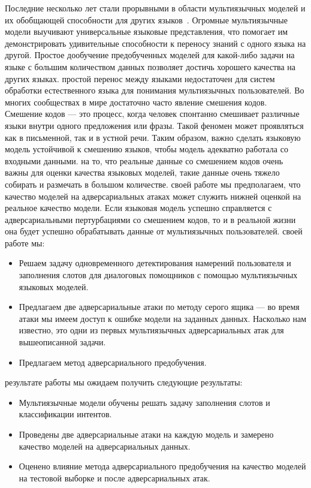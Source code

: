 Последние несколько лет стали прорывными в области мультиязычных моделей и их обобщающей способности для других языков~\cite{Conneau2020UnsupervisedCR,devlin-etal-2019-bert,Liu2020WhatMM,Wu2019BetoBB}.
Огромные мультиязычные модели выучивают универсальные языковые представления, что помогает им демонстрировать удивительные способности к переносу знаний с одного языка на другой.
Простое дообучение предобученных моделей для какой-либо задачи на языке с большим количеством данных позволяет достичь хорошего качества на других языках.
 простой перенос между языками недостаточен для систем обработки естественного языка для понимания мультиязычных пользователей.
Во многих сообществах в мире достаточно часто явление смешения кодов.
Смешение кодов — это процесс, когда человек спонтанно смешивает различные языки внутри одного предложения или фразы.
Такой феномен может проявляться как в письменной, так и в устной речи.
Таким образом, важно сделать языковую модель устойчивой к смешению языков, чтобы модель адекватно работала со входными данными.
 на то, что реальные данные со смешением кодов очень важны для оценки качества языковых моделей, такие данные очень тяжело собирать и размечать в большом количестве.
 своей работе мы предполагаем, что качество моделей на адверсариальных атаках может служить нижней оценкой на реальное качество модели.
Если языковая модель успешно справляется с адверсариальными пертурбациями со смешением кодов, то и в реальной жизни она будет успешно обрабатывать данные от мультиязычных пользователей.
 своей работе мы:
\begin{itemize}
    \item Решаем задачу одновременного детектирования намерений пользователя и заполнения слотов для диалоговых помощников с помощью мультиязычных языковых моделей.
    \item Предлагаем две адверсариальные атаки по методу серого ящика — во время атаки мы имеем доступ к ошибке модели на заданных данных.
    Насколько нам известно, это одни из первых мультиязычных адверсариальных атак для вышеописанной задачи.
    \item Предлагаем метод адверсариального предобучения.
\end{itemize}
 результате работы мы ожидаем получить следующие результаты:
\begin{itemize}
    \item Мультиязычные модели обучены решать задачу заполнения слотов и классификации интентов.
    \item Проведены две адверсариальные атаки на каждую модель и замерено качество моделей на адверсариальных данных.
    \item Оценено влияние метода адверсариального предобучения на качество моделей на тестовой выборке и после адверсариальных атак.
\end{itemize}
